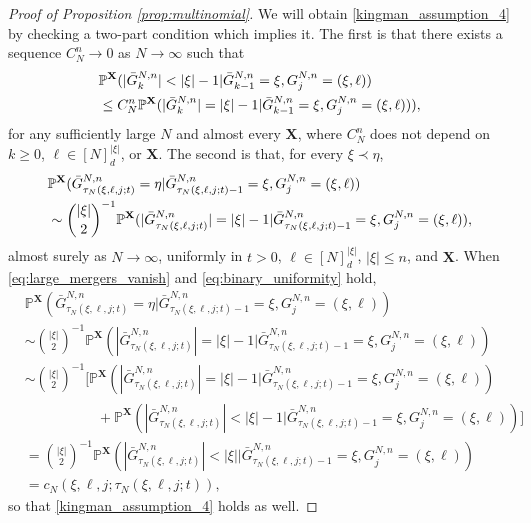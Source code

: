 \documentclass[a4paper,11pt]{article}
\theoremstyle{definition}
\newcommand{\bbP}{\mathbb{P}}
\newcommand{\bfX}{\mathbf{X}}
\begin{document}
\begin{proof}[Proof of Proposition \ref{prop:multinomial}]
We will obtain \eqref{kingman_assumption_4} by checking a two-part condition which implies it.
The first is that there exists a sequence $C_N^n \to 0$ as $N \to \infty$ such that
\begin{align} 
&\bbP^{ \bfX }( | \bar{ G }_k^{ N, n } | < | \xi | - 1 | \bar{ G }_{ k - 1 }^{ N, n } = \xi, G_j^{ N, n } = ( \xi, \ell ) ) \notag \\
&\leq C_N^n \bbP^{ \bfX }( | \bar{ G }_k^{ N, n } | = | \xi | - 1 | \bar{ G }_{ k - 1 }^{ N, n } = \xi, G_j^{ N, n } = ( \xi, \ell ) ) ), \label{eq:large_mergers_vanish} 
\end{align}
for any sufficiently large $N$ and almost every $\bfX$, where $C_N^n$ does not depend on $k \geq 0$, $\ell \in [ N ]_d^{ | \xi | }$, or $\bfX$.
The second is that, for every $\xi \prec \eta$,
\begin{align}
&\bbP^{ \bfX }( \bar{ G }_{ \tau_N( \xi, \ell, j; t ) }^{ N, n } = \eta | \bar{ G }_{ \tau_N( \xi, \ell, j; t ) - 1 }^{ N, n } = \xi, G_j^{ N, n } = ( \xi, \ell ) ) \notag \\
&\sim \binom{ | \xi | }{ 2 }^{ -1 } \bbP^{ \bfX }( | \bar{ G }_{ \tau_N( \xi, \ell, j; t ) }^{ N, n } | = | \xi | - 1  | \bar{ G }_{ \tau_N( \xi, \ell, j; t ) - 1 }^{ N, n } = \xi, G_j^{ N, n } = ( \xi, \ell ) ), \label{eq:binary_uniformity}
\end{align}
almost surely as $N \to \infty$, uniformly in $t > 0$, $\ell \in [ N ]_d^{ | \xi | }$, $| \xi | \leq n$, and $\bfX$.
When \eqref{eq:large_mergers_vanish} and \eqref{eq:binary_uniformity} hold,
\begin{align*}
&\bbP^{ \bfX }( \bar{ G }_{ \tau_N( \xi, \ell, j; t ) }^{ N, n } = \eta | \bar{ G }_{ \tau_N( \xi, \ell, j; t ) - 1 }^{ N, n } = \xi, G_j^{ N, n } = ( \xi, \ell ) ) \\
&\sim \binom{ | \xi | }{ 2 }^{ -1 } \bbP^{ \bfX }( | \bar{ G }_{ \tau_N( \xi, \ell, j; t ) }^{ N, n } | = | \xi | - 1  | \bar{ G }_{ \tau_N( \xi, \ell, j; t ) - 1 }^{ N, n } = \xi, G_j^{ N, n } = ( \xi, \ell ) ) \\
&\sim \binom{ | \xi | }{ 2 }^{ -1 } [ \bbP^{ \bfX }( | \bar{ G }_{ \tau_N( \xi, \ell, j; t ) }^{ N, n } | = | \xi | - 1 | \bar{ G }_{ \tau_N( \xi, \ell, j; t ) - 1 }^{ N, n } = \xi, G_j^{ N, n } = ( \xi, \ell ) ) \\
&\phantom{= \binom{ | \xi | }{ 2 }^{ -1 } [}+ \bbP^{ \bfX }( | \bar{ G }_{ \tau_N( \xi, \ell, j; t ) }^{ N, n } | < | \xi | - 1 | \bar{ G }_{ \tau_N( \xi, \ell, j; t ) - 1 }^{ N, n } = \xi, G_j^{ N, n } = ( \xi, \ell ) ) ] \\
&= \binom{ | \xi | }{ 2 }^{ -1 } \bbP^{ \bfX }( | \bar{ G }_{ \tau_N( \xi, \ell, j; t ) }^{ N, n } | < | \xi | | \bar{ G }_{ \tau_N( \xi, \ell, j; t ) - 1 }^{ N, n } = \xi, G_j^{ N, n } = ( \xi, \ell ) ) \\
&= c_N( \xi, \ell, j; \tau_N( \xi, \ell, j; t ) ),
\end{align*}
so that \eqref{kingman_assumption_4} holds as well.


\end{proof}
\end{document}
